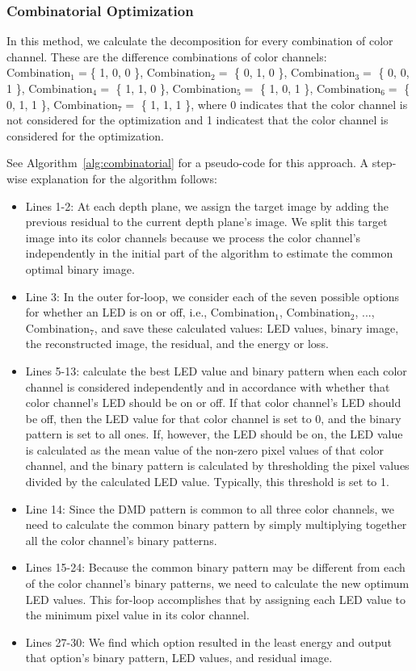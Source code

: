 \subsubsection{Combinatorial Optimization}
\label{sec:acd:combinatorial}
In this method, we calculate the decomposition for every combination of color channel. 
These are the difference combinations of color channels: $\text{Combination}_1 = $\{ 1, 0, 0 \}, $\text{Combination}_2 = $ \{ 0, 1, 0 \}, $\text{Combination}_3 = $ \{ 0, 0, 1 \}, $\text{Combination}_4 = $ \{ 1, 1, 0 \}, $\text{Combination}_5 = $ \{ 1, 0, 1 \}, $\text{Combination}_6 = $ \{ 0, 1, 1 \}, $\text{Combination}_7 = $ \{ 1, 1, 1 \}, where 0 indicates that the color channel is not considered for the optimization and 1 indicatest that the color channel is considered for the optimization. 


%
See Algorithm~\ref{alg:combinatorial} for a pseudo-code for this approach. A step-wise explanation for the algorithm follows:
\begin{itemize}
    \item Lines 1-2: At each depth plane, we assign the target image by adding the previous residual to the current depth plane's image. We split this target image into its color channels because we process the color channel's independently in the initial part of the algorithm to estimate the common optimal binary image.
    \item Line 3: In the outer for-loop, we consider each of the seven possible options for whether an LED is on or off, i.e., $\text{Combination}_1$, $\text{Combination}_2$, ..., $\text{Combination}_7$, and save these calculated values: LED values, binary image, the reconstructed image, the residual, and the energy or loss.
    \item Lines 5-13: calculate the best LED value and binary pattern when each color channel is considered independently and in accordance with whether that color channel's LED should be on or off. If that color channel's LED should be off, then the LED value for that color channel is set to 0, and the binary pattern is set to all ones. If, however, the LED should be on, the LED value is calculated as the mean value of the non-zero pixel values of that color channel, and the binary pattern is calculated by thresholding the pixel values divided by the calculated LED value. Typically, this threshold is set to 1.
    \item Line 14: Since the DMD pattern is common to all three color channels, we need to calculate the common binary pattern by simply multiplying together all the color channel's binary patterns. 
    \item Lines 15-24: Because the common binary pattern may be different from each of the color channel's binary patterns, we need to calculate the new optimum LED values. This for-loop accomplishes that by assigning each LED value to the minimum pixel value in its color channel.
    \item Lines 27-30: We find which option resulted in the least energy and output that option's binary pattern, LED values, and residual image. 
\end{itemize}


